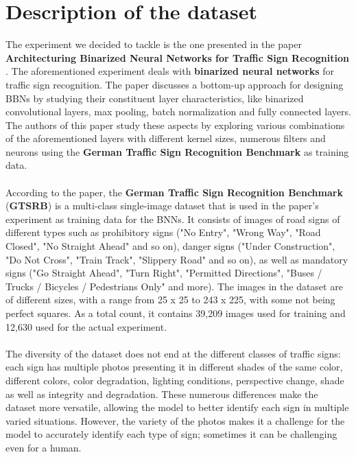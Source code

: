 \documentclass[12pt,a4paper]{report}
\newcommand\tab[1][5mm]{\hspace*{#1}}
\begin{document}
\chapter{Description of the dataset}
\tab The experiment we decided to tackle is the one presented in the paper \textbf{Architecturing Binarized Neural Networks for Traffic Sign Recognition} \cite{traffic_signs_paper}. The aforementioned experiment deals with \textbf{binarized neural networks} for traffic sign recognition. The paper discusses a bottom-up approach for designing BBNs by studying their constituent layer characteristics, like binarized convolutional layers, max pooling, batch normalization and fully connected layers. The authors of this paper study these aspects by exploring various combinations of the aforementioned layers with different kernel sizes, numerous filters and neurons using the \textbf{German Traffic Sign Recognition Benchmark} as training data.\\\\
\tab According to the paper, the \textbf{German Traffic Sign Recognition Benchmark} (\textbf{GTSRB}) is a multi-class single-image dataset that is used in the paper's experiment as training data for the BNNs. It consists of images of road signs of different types such as prohibitory signs ("No Entry", "Wrong Way", "Road Closed", "No Straight Ahead" and so on), danger signs ("Under Construction", "Do Not Cross", "Train Track", "Slippery Road" and so on), as well as mandatory signs ("Go Straight Ahead", "Turn Right", "Permitted Directions", "Buses / Trucks / Bicycles / Pedestrians Only" and more). The images in the dataset are of different sizes, with a range from 25 x 25 to 243 x 225, with some not being perfect squares. As a total count, it contains 39,209 images used for training and 12,630 used for the actual experiment.\\\\
The diversity of the dataset does not end at the different classes of traffic signs: each sign has multiple photos presenting it in different shades of the same color, different colors, color degradation, lighting conditions, perspective change, shade as well as integrity and degradation. These numerous differences make the dataset more versatile, allowing the model to better identify each sign in multiple varied situations. However, the variety of the photos makes it a challenge for the model to accurately identify each type of sign; sometimes it can be challenging even for a human.\\ \\
\end{document}
